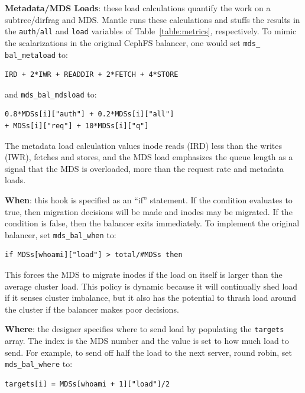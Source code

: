 \textbf{Metadata/MDS Loads}: these load calculations quantify the work on a subtree/dirfrag and MDS. Mantle runs these calculations and stuffs the results in the \texttt{auth}/\texttt{all} and \texttt{load} variables of Table~\ref{table:metrics}, respectively. To mimic the scalarizations in the original CephFS balancer, one would set \texttt{mds\_} \texttt{bal\_}\texttt{metaload} to:

{\small\begin{verbatim}
IRD + 2*IWR + READDIR + 2*FETCH + 4*STORE
\end{verbatim}}

\noindent and \texttt{mds\_bal\_mdsload} to:

{\small\begin{verbatim}
0.8*MDSs[i]["auth"] + 0.2*MDSs[i]["all"]
+ MDSs[i]["req"] + 10*MDSs[i]["q"]
\end{verbatim}}

The metadata load calculation values inode reads (IRD) less than the writes (IWR), fetches and stores, and the MDS load emphasizes the queue length as a signal that the MDS is overloaded, more than the request rate and metadata loads. 

\textbf{When}: this hook is specified as an ``if'' statement. If the condition evaluates to true, then migration decisions will be made and inodes may be migrated. If the condition is false, then the balancer exits immediately. To implement the original balancer, set \texttt{mds\_bal\_when} to:

{\small\begin{verbatim}
if MDSs[whoami]["load"] > total/#MDSs then
\end{verbatim}}

This forces the MDS to migrate inodes if the load on itself is larger than the average cluster load. This policy is dynamic because it will continually shed load if it senses cluster imbalance, but it also has the potential to thrash load around the cluster if the balancer makes poor decisions. 

\textbf{Where}: the designer specifies where to send load by populating the \texttt{targets} array. The index is the MDS number and the value is set to how much load to send. For example, to send off half the load to the next server, round robin, set \texttt{mds\_bal\_where} to:

{\small\begin{verbatim}
targets[i] = MDSs[whoami + 1]["load"]/2
\end{verbatim}}

